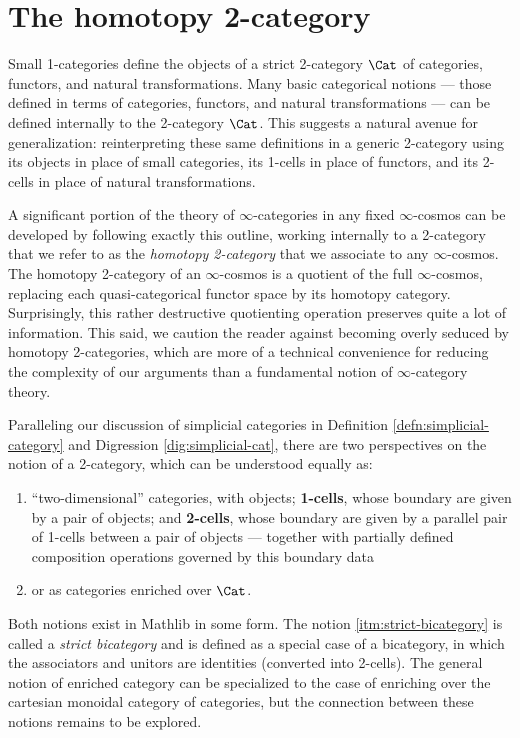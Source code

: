 \section{The homotopy 2-category}\label{sec:htpy-2-cat}

Small 1-categories define the objects of a strict 2-category $\Cat$ of categories, functors, and natural transformations. Many basic categorical notions --- those defined in terms of categories, functors, and natural transformations --- can be defined internally to the 2-category $\Cat$. This suggests a natural avenue for generalization: reinterpreting these same definitions in a generic 2-category using its objects in place of small categories, its 1-cells in place of functors, and its 2-cells in place of natural transformations.

A significant portion of the theory of $\infty$-cat\-e\-go\-ries in any fixed $\infty$-cosmos can be developed by following exactly this outline, working internally to a 2-category that we refer to as the \emph{homotopy 2-category} that we associate to any $\infty$-cosmos. The homotopy 2-category of an $\infty$-cosmos is a quotient of the full $\infty$-cosmos, replacing each quasi-categorical functor space by its homotopy category. Surprisingly, this rather destructive quotienting operation preserves quite a lot of information.  This said, we caution the reader against becoming overly seduced by homotopy 2-categories, which are more of a technical convenience for reducing the complexity of our arguments than a fundamental notion of $\infty$-category theory.

Paralleling our discussion of simplicial categories in Definition \ref{defn:simplicial-category} and Digression \ref{dig:simplicial-cat}, there are two perspectives on the notion of a 2-category, which can be understood equally as:
\begin{enumerate}
\item\label{itm:strict-bicategory}  ``two-dimensional'' categories, with objects; \textbf{1-cells}, whose boundary are given by a pair of objects; and \textbf{2-cells}, whose boundary are given by a parallel pair of 1-cells between a pair of objects --- together with partially defined composition operations governed by this boundary data
\item or as categories enriched over $\Cat$.
\end{enumerate}

Both notions exist in Mathlib in some form. The notion \ref{itm:strict-bicategory} is called a \emph{strict bicategory} and is defined as a special case of a bicategory, in which the associators and unitors are identities (converted into 2-cells). The general notion of enriched category can be specialized to the case of enriching over the cartesian monoidal category of categories, but the connection between these notions remains to be explored.

